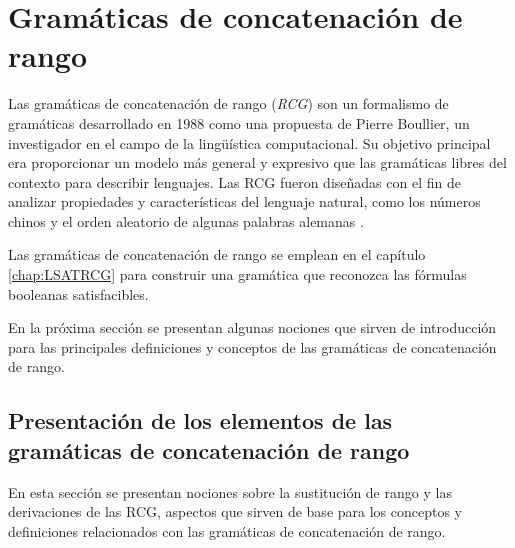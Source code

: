 
\chapter{Gramáticas de concatenación de rango}
\label{chap:RCG}




Las gramáticas de concatenación de rango (\textit{RCG}) \cite{mainRCGBib} son un formalismo de gramáticas desarrollado 
en 1988 como una propuesta de Pierre Boullier, un investigador en el campo de la lingüística computacional. Su objetivo 
principal era proporcionar un modelo más general y expresivo que las gramáticas libres del contexto para describir 
lenguajes.  Las RCG fueron diseñadas con el fin de analizar propiedades y características del lenguaje natural, como los números
chinos y el orden aleatorio de algunas palabras alemanas \cite{boullier1999chinese}.

Las gramáticas de concatenación de rango se emplean en el capítulo \ref{chap:LSATRCG} para construir una gramática que reconozca las fórmulas booleanas satisfacibles.

En la próxima sección se presentan algunas nociones que sirven de introducción para las principales definiciones y conceptos de las gramáticas de concatenación de rango.

\section{Presentación de los elementos de las gramáticas de concatenación de rango}

En esta sección se presentan nociones sobre la sustitución de rango y las derivaciones de las RCG, aspectos 
que sirven de base para los conceptos y definiciones relacionados con las gramáticas de concatenación de rango.

